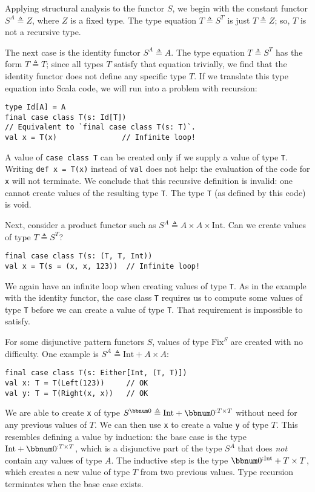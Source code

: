 Applying structural analysis to the functor $S$, we begin with the
constant functor $S^{A}\triangleq Z$, where $Z$ is a fixed type.
The type equation $T\triangleq S^{T}$ is just $T\triangleq Z$; so,
$T$ is not a recursive type.

The next case is the identity functor $S^{A}\triangleq A$. The type
equation $T\triangleq S^{T}$ has the form $T\triangleq T$; since
all types $T$ satisfy that equation trivially, we find that the identity
functor does not define any specific type $T$. If we translate this
type equation into Scala code, we will run into a problem with recursion:
\begin{lstlisting}
type Id[A] = A
final case class T(s: Id[T])
// Equivalent to `final case class T(s: T)`.
val x = T(x)               // Infinite loop!
\end{lstlisting}
A value of \lstinline!case class T! can be created only if we supply
a value of type \lstinline!T!. Writing \lstinline!def x = T(x)!
instead of \lstinline!val! does not help: the evaluation of the code
for \lstinline!x! will not terminate. We conclude that this recursive
definition is invalid: one cannot create values of the resulting type
\lstinline!T!. The type \lstinline!T! (as defined by this code)
is void.

Next, consider a product functor such as $S^{A}\triangleq A\times A\times\text{Int}$.
Can we create values of type $T\triangleq S^{T}$?
\begin{lstlisting}
final case class T(s: (T, T, Int))
val x = T(s = (x, x, 123))  // Infinite loop!
\end{lstlisting}
We again have an infinite loop when creating values of type \lstinline!T!.
As in the example with the identity functor, the case class \lstinline!T!
requires us to compute some values of type \lstinline!T! before we
can create a value of type \lstinline!T!. That requirement is impossible
to satisfy.

For some disjunctive pattern functors $S$, values of type $\text{Fix}^{S}$
are created with no difficulty. One example is $S^{A}\triangleq\text{Int}+A\times A$:
\begin{lstlisting}
final case class T(s: Either[Int, (T, T)])
val x: T = T(Left(123))     // OK
val y: T = T(Right(x, x))   // OK
\end{lstlisting}
We are able to create \lstinline!x! of type $S^{\bbnum 0}\triangleq\text{Int}+\bbnum 0^{:T\times T}$
without need for any previous values of $T$. We can then use \lstinline!x!
to create a value \lstinline!y! of type $T$. This resembles defining
a value by induction: the base case is the type $\text{Int}+\bbnum 0^{:T\times T}$,
which is a disjunctive part of the type $S^{A}$ that does \emph{not}
contain any values of type $A$. The inductive step is the type $\bbnum 0^{:\text{Int}}+T\times T$,
which creates a new value of type $T$ from two previous values. Type
recursion terminates when the base case exists.

